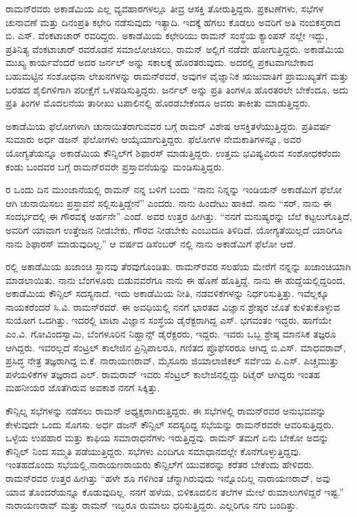 ರಾಮನ್‍ರವರು ಅಕಾಡೆಮಿಯ ಎಲ್ಲ ವ್ಯವಹಾರಗಳಲ್ಲೂ ತೀವ್ರ ಆಸಕ್ತಿ ತೋರುತ್ತಿದ್ದರು. ಪ್ರಕಟಣೆಗಳು, ಸಭೆಗಳ ಚುನಾವಣೆ ಮತ್ತು ದಿನಂಪ್ರತಿ ಕಛೇರಿ ನಡೆಸುವುದು ಇತ್ಯಾದಿ. ಇದಕ್ಕೆ ಹೆಗಲು ಕೊಡಲು ಅವರಿಗೆ ಅತಿ ನಂಬಿಕಸ್ತರಾದ ಬಿ. ಎಸ್. ವೆಂಕಟಾಚಾರ್ ರವರಿದ್ದರು. ಅಕಾಡೆಮಿಯ ಕಛೇರಿಯು ರಾಮನ್ ಸಂಸ್ಥೆಯ ಕ್ಯಾಂಪಸ್ ನಲ್ಲೇ ಇದ್ದು, ಪ್ರತಿನಿತ್ಯ ವೆಂಕಟಾಚಾರ್ ರವರೊಡನೆ ಸಮಾಲೋಚಿಸಲು, ರಾಮನ್ ಅಲ್ಲಿಗೆ ನಡೆದೇ ಹೋಗುತ್ತಿದ್ದರು. ಅಕಾಡೆಮಿಯ ಮುಖ್ಯ ಕಾರ್ಯವೆಂದರೆ ಅದರ ಜರ್ನಲ್  ಅನ್ನು ಸಕಾಲಕ್ಕೆ ಹೊರತರುವುದು. ಅದರಲ್ಲಿ ಪ್ರಕಟವಾಗಬೇಕಾದ ಬಹುಮಟ್ಟಿನ ಸಂಶೋಧನಾ ಲೇಖನಗಳನ್ನು ರಾಮನ್‍ರವರೆ, ಅವುಗಳ ವೈಜ್ಞಾನಿಕ ಋಜುವಾತಿಗೆ ಪ್ರಾಮುಖ್ಯತೆಗೆ ಮತ್ತು ಬರಹದ ಶೈಲಿಗಳಿಗಾಗಿ ಪರೀಕ್ಷೆಗೆ ಒಳಪಡಿಸುತ್ತಿದ್ದರು. ಜರ್ನಲ್ ಅನ್ನು ಪ್ರತಿ ತಿಂಗಳೂ ಹೊರತರಲೇ ಬೇಕೆಂದೂ, ಅದು ಪ್ರತಿ ತಿಂಗಳ ಮೊದಲನೆಯ ತಾರೀಖು ಟಪಾಲಿನಲ್ಲಿ ಹೊರಡಬೇಕೆಂದೂ ಅವರು ತಾಕೀತು ಮಾಡುತ್ತಿದ್ದರು.

ಅಕಾಡೆಮಿಯ ಫೆಲೋಗಳಾಗಿ ಚುನಾಯಿತರಾಗುವವರ ಬಗ್ಗೆ ರಾಮನ್ ವಿಶೇಷ ಆಸಕ್ತಿ\break ತಳೆಯುತ್ತಿದ್ದರು. ಪ್ರತಿವರ್ಷ ಸುಮಾರು ಅರ್ಧ ಡಜನ್ ಫೆಲೋಗಳು ಆಯ್ಕೆಯಾಗುತ್ತಿದ್ದರು. ಫೆಲೋಗಳ ನೇಮಕಾತಿಗಳನ್ನೂ, ಅವರ ಯೋಗ್ಯತೆಯನ್ನೂ ಅಕಾಡೆಮಿಯ ಕೌನ್ಸಿಲ್‍ಗೆ ಶಿಫಾರಸ್ ಮಾಡುತ್ತಿದ್ದರು. ಉತ್ತಮ ಭವಿಷ್ಯವಿರುವ ಸಂಶೋಧಕರೆಂದು ಕಂಡು ಬಂದವರ ಬಗ್ಗೆ ರಾಮನ್‍ರವರೇ ಪ್ರಸ್ತಾವನೆಯನ್ನು ಮಂಡಿಸುತ್ತಿದ್ದರು.

ರ ಒಂದು ದಿನ ಮುಂಜಾನೆಯಲ್ಲಿ ರಾಮನ್ ನನ್ನ ಬಳಿಗೆ ಬಂದು \enginline{--} “ನಾನು ನಿನ್ನನ್ನು ಇಂಡಿಯನ್ ಅಕಾಡೆಮಿಗೆ ಫೆಲೋ ಆಗಿ ಚುನಾಯಿಸಲು ಪ್ರಸ್ತಾವನೆ ಸಲ್ಲಿಸುತ್ತಿದ್ದೇನೆ” ಎಂದರು. ನಾನು ಹಿಂದೇಟು ಹಾಕಿದೆ. ನಾನು “ಸರ್, ನಾನು ಈ ಸಂದರ್ಭದಲ್ಲಿ ಈ ಗೌರವಕ್ಕೆ ಅರ್ಹನೇ” ಎಂದೆ. ಅವರ ಉತ್ತರ ಹೀಗಿತ್ತು. \enginline{--} “ನನಗೆ ಮನುಷ್ಯರನ್ನು ಬೆಲೆ ಕಟ್ಟಲುಗೊತ್ತಿದೆ, ಅವರಿಗೆ ಯಾವಾಗ ಉತ್ತೇಜನ ನೀಡಬೇಕು, ಗೌರವ ನೀಡಬೇಕು ಎಂಬುದೂ ತಿಳಿದಿದೆ. ಯೋಗ್ಯತೆಯಿಲ್ಲದೆ ಯಾರಿಗೂ ನಾನು ಶಿಫಾರಸ್ ಮಾಡುವುದಿಲ್ಲ.” ಆ ವರ್ಷದ ಡಿಸೆಂಬರ್ ನಲ್ಲಿ ನಾನು ಅಕಾಡೆಮಿಗೆ ಫೆಲೋ ಆದೆ.

ರಲ್ಲಿ ಅಕಾಡೆಮಿಯ ಖಜಾಂಚಿ ಸ್ಥಾನವು ತೆರವುಗೊಂಡಿತು. ರಾಮನ್‍ರವರ ಸಲಹೆಯ ಮೇರೆಗೆ ನನ್ನನ್ನು ಖಜಾಂಚಿಯಾಗಿ ಮಾಡಲಾಯಿತು. ನಾನು ಬೆಂಗಳೂರು ಬಿಡುವವರೆಗೂ ನಾನು ಈ ಹೊಣೆ ಹೊತ್ತಿದ್ದೆ. ನಾನು ಈ ಹುದ್ದೆಯಲ್ಲಿದ್ದರಿಂದ, ಅಕಾಡೆಮಿಯ ಕೌನ್ಸಿಲ್ ಸದಸ್ಯನಾದೆ. ಇದು ಅಕಾಡೆಮಿಯ ನೀತಿ, ನಡವಳಿಕೆಗಳನ್ನು ನಿರ್ಧರಿಸುತ್ತಿತ್ತು. ಇವೆಲ್ಲಕ್ಕೂ ನಾಯಕರೆಂದರೆ ಸಿ.ವಿ. ರಾಮನ್‍ರವರೆ. ಈ ಅವಧಿಯಲ್ಲಿ ನನಗೆ ಭಾರತದ ವಿಜ್ಞಾನ ಶ್ರೇಷ್ಠರ ಜೊತೆ ಕುಳಿತುಕೊಳ್ಳುವ ಸುಯೋಗ ಒದಗಿತ್ತು. ಇದರಲ್ಲಿ ಟಾಟಾ ವಿಜ್ಞಾನ ಸಂಸ್ಥೆಯ ಡೈರೆಕ್ಟರಾಗಿದ್ದ ಎಸ್. ಭಗವಂತಂ ಇದ್ದರು. ಹಾಗೆಯೇ ಎಂ.ವಿ. ಗೋವಿಂದಸ್ವಾಮಿ, ಬೆಂಗಳೂರಿನ ನಿಹ್ಹಾನ್ಸ್ ಡೈರೆಕ್ಟರರು, ಇದ್ದರು. ಇವರು ಒಬ್ಬ ಶ್ರೇಷ್ಠ ಮಾನಸಿಕ ತಜ್ಞರೂ ಆಗಿದ್ದರು. ಇವರಲ್ಲದೆ ಸೆಂಟ್ರಲ್ ಕಾಲೇಜಿನ ಪ್ರಿನ್ಸಿಪಾಲರೂ, ಗಣಿತದ ಪ್ರೊಫೆಸರರೂ ಆಗಿದ್ದ ಬಿ.ಎಸ್. ಮಾಧವರಾವ್, ಪ್ರಸಿದ್ಧ ನೇತ್ರ ತಜ್ಞರಾಗಿದ್ದ ಬಿ.ಕೆ. ನಾರಾಯಣರಾವ್, ಮೈಸೂರು ಜಿಯಾಲಾಜಿಕಲ್ ಸರ್ವೆಯ ಪಿ.ಎಸ್. ಪಿಚ್ಚಮುತ್ತು ಪಳೆಯಳಿಕೆಗಳ ತಜ್ಞರಾದ ಎಲ್. ರಾಮರಾವ್ ಇವರು ಸೆಂಟ್ರಲ್ ಕಾಲೇಜಿನಲ್ಲಿದ್ದು ರಿಟೈರ್ ಆಗಿದ್ದರು\enginline{-} ಇಂತಹ ಮಹನೀಯರ ಜೊತೆಗಿರುವ ಅವಕಾಶ ನನಗೆ ಸಿಕ್ಕಿತ್ತು.

\vskip 2pt

ಕೌನ್ಸಿಲ್ನ ಸಭೆಗಳನ್ನು ನಡೆಸಲು ರಾಮನ್ ಅಧ್ಯಕ್ಷರಾಗಿರುತ್ತಿದ್ದರು. ಈ ಸಭೆಗಳಲ್ಲಿ ರಾಮನ್‍ರವರ ಅನುಭವವನ್ನು ಕೇಳುವುದೇ ಒಂದು ಸೊಗಸು. ಅರ್ಧ ಡಜನ್ ಕೌನ್ಸಿಲ್ ಸದಸ್ಯರಿದ್ದ ಸಭೆಯನ್ನು ರಾಮನ್‍ರವರೇ ಆವರಿಸುತ್ತಿದ್ದರು. ಒಳ್ಳೆಯ ಉಪಹಾರ ಮತ್ತು ಕಾಫಿಯ ಸಮಾರಾಧನೆಗಳು ಇರುತ್ತಿದ್ದವು. ರಾಮನ್ ತಮಗೆ ಏನು ಬೇಕೋ ಅದನ್ನು ಕೌನ್ಸಿಲ್ ನಿಂದ ಸಮ್ಮತಿ ಪಡೆಯುತ್ತಿದ್ದರು. ಸಭೆಗಳು ಎಂದಿಗೂ ಸಮಾಧಾನದಲ್ಲೇ ಕೊನೆಗೊಳ್ಳುತ್ತಿದ್ದವು. ಇಂತಹದೊಂದು ಸಭೆಯಲ್ಲಿ,\break ನಾರಾಯಣರಾಯರು ಕೌನ್ಸಿಲ್‍ಗೆ ಯುವಕರನ್ನು ಕರೆತರ ಬೇಕೆಂದು ಹೇಳಿದರು. ರಾಮನ್‍ರವರ ಉತ್ತರ ಹೀಗಿತ್ತು\enginline{--} “ಹಳೇ ಶೂ ಗಳಿಗಿಂತ ಚೆನ್ನಾಗಿರುವುದು ಇನ್ನೊಂದಿಲ್ಲ ನಾರಾಯಣರಾವ್, ಅವು ಯಾವ ತೊಂದರೆಯನ್ನೂ ಕೊಡುವುದಿಲ್ಲ. ನನಗೆ ಹಳೆಯ, ಬಿಳಿಕೂದಲಿನ ತಲೆಗಳ ಮೇಲೆ ರುಮಾಲುಗಳಿದ್ದರೆ ಇಷ್ಟ.” ನಾರಾಯಣರಾವ್ ಮತ್ತು ರಾಮನ್ ಇಬ್ಬರೂ ರುಮಾಲು ಧರಿಸುತ್ತಿದ್ದರು. ಎಲ್ಲರಿಗೂ ನಗು ಬಂದಿತ್ತು.


